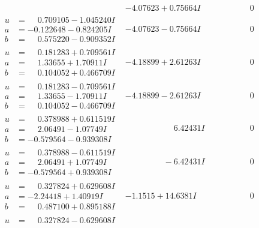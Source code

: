 \documentclass[1p]{elsarticle_modified}
\theoremstyle{definition}
\begin{document}
$$\begin{array}{c|c|c}
 & -4.07623 + 0.75664 I & \phantom{-0.000000 } 0 \\ \hline\begin{aligned}
u &= \phantom{-}0.709105 - 1.045240 I \\
a &= -0.122648 - 0.824205 I \\
b &= \phantom{-}0.575220 - 0.909352 I\end{aligned}
 & -4.07623 - 0.75664 I & \phantom{-0.000000 } 0 \\ \hline\begin{aligned}
u &= \phantom{-}0.181283 + 0.709561 I \\
a &= \phantom{-}1.33655 + 1.70911 I \\
b &= \phantom{-}0.104052 + 0.466709 I\end{aligned}
 & -4.18899 + 2.61263 I & \phantom{-0.000000 } 0 \\ \hline\begin{aligned}
u &= \phantom{-}0.181283 - 0.709561 I \\
a &= \phantom{-}1.33655 - 1.70911 I \\
b &= \phantom{-}0.104052 - 0.466709 I\end{aligned}
 & -4.18899 - 2.61263 I & \phantom{-0.000000 } 0 \\ \hline\begin{aligned}
u &= \phantom{-}0.378988 + 0.611519 I \\
a &= \phantom{-}2.06491 - 1.07749 I \\
b &= -0.579564 - 0.939308 I\end{aligned}
 & \phantom{-0.000000 -}6.42431 I & \phantom{-0.000000 } 0 \\ \hline\begin{aligned}
u &= \phantom{-}0.378988 - 0.611519 I \\
a &= \phantom{-}2.06491 + 1.07749 I \\
b &= -0.579564 + 0.939308 I\end{aligned}
 & \phantom{-0.000000 } -6.42431 I & \phantom{-0.000000 } 0 \\ \hline\begin{aligned}
u &= \phantom{-}0.327824 + 0.629608 I \\
a &= -2.24418 + 1.40919 I \\
b &= \phantom{-}0.487100 + 0.895188 I\end{aligned}
 & -1.1515 + 14.6381 I & \phantom{-0.000000 } 0 \\ \hline\begin{aligned}
u &= \phantom{-}0.327824 - 0.629608 I \\

\end{aligned}
\end{array}$$
\end{document}
